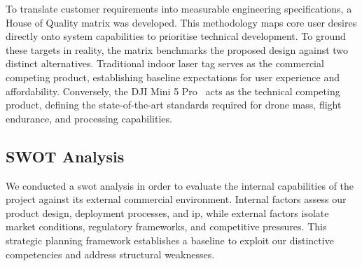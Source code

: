 \documentclass{report_template_oxford}
\begin{document}
To translate customer requirements into measurable engineering specifications, a House of Quality matrix was developed. This methodology maps core user desires directly onto system capabilities to prioritise technical development. To ground these targets in reality, the matrix benchmarks the proposed design against two distinct alternatives. Traditional indoor laser tag serves as the commercial competing product, establishing baseline expectations for user experience and affordability. Conversely, the DJI Mini 5 Pro~\cite{dji2026mini5pro, dji2026transmission, parkcameras2026mini5pro} acts as the technical competing product, defining the state-of-the-art standards required for drone mass, flight endurance, and processing capabilities.

\newpage
{}
\subsection{SWOT Analysis}
We conducted a \gls{swot} analysis in order to evaluate the internal capabilities of the project against its external commercial environment. Internal factors assess our product design, deployment processes, and \gls{ip}, while external factors isolate market conditions, regulatory frameworks, and competitive pressures. This strategic planning framework establishes a baseline to exploit our distinctive competencies and address structural weaknesses.
\end{document}
